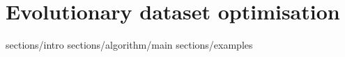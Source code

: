 \chapter{Evolutionary dataset optimisation}
\graphicspath{{chapters/02/edo-paper/img/}}

{sections/intro}
{sections/algorithm/main}
{sections/examples}

